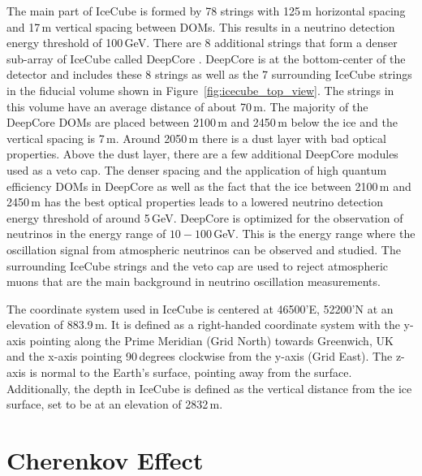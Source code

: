 The main part of IceCube is formed by 78 strings with 125\,m horizontal spacing and 17\,m vertical spacing between DOMs.
This results in a neutrino detection energy threshold of 100\,GeV. There are 8 additional strings that form a denser sub-array of IceCube called DeepCore \cite{DeepCore_design_Abbasi2012615}.
DeepCore is at the bottom-center of the detector and includes these 8 strings as well as the 7 surrounding IceCube strings in the fiducial volume shown in Figure~\ref{fig:icecube_top_view}.
The strings in this volume have an average distance of about 70\,m.
The majority of the DeepCore DOMs are placed between 2100\,m and 2450\,m below the ice and the vertical spacing is 7\,m.
Around 2050\,m there is a dust layer with bad optical properties. Above the dust layer, there are a few additional DeepCore modules used as a veto cap.
The denser spacing and the application of high quantum efficiency DOMs in DeepCore as well as the fact that the ice between 2100\,m and 2450\,m has the best optical properties leads to a lowered neutrino detection energy threshold of around 5\,GeV.
DeepCore is optimized for the observation of neutrinos in the energy range of $10-100$\,GeV.
This is the energy range where the oscillation signal from atmospheric neutrinos can be observed and studied.
The surrounding IceCube strings and the veto cap are used to reject atmospheric muons that are the main background in neutrino oscillation measurements.

The coordinate system \cite{2017JInst..12P3012A_Instrumentation_Systems} used in IceCube is centered at 46500'E, 52200'N at an elevation of 883.9\,m.
It is defined as a right-handed coordinate system with the y-axis pointing along the Prime Meridian (Grid North) towards Greenwich, UK and the x-axis pointing 90\,degrees clockwise from the y-axis (Grid East).
The z-axis is normal to the  Earth's surface, pointing away from the surface.
Additionally, the depth in IceCube is defined as the vertical distance from the ice surface, set to be at an elevation of 2832\,m.


\section{Cherenkov Effect} \label{sec:cherenkov_effect}

